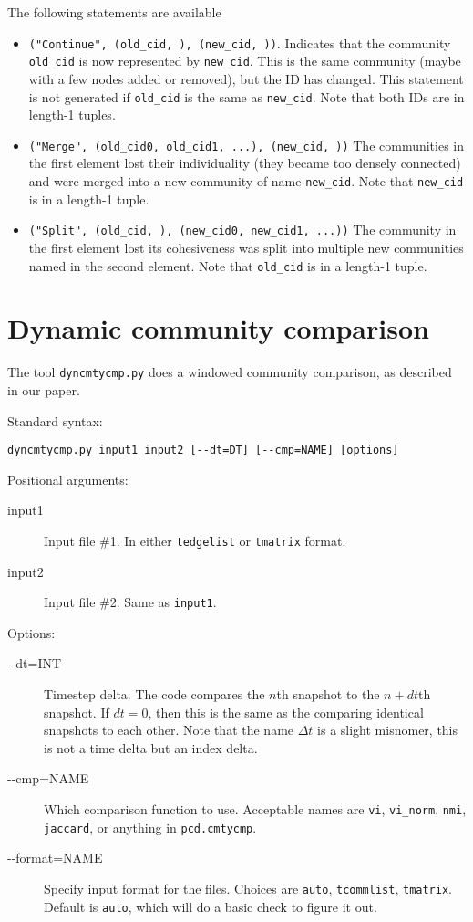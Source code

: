 \documentclass{article}
\begin{document}
The following statements are available
\begin{itemize}
\item \texttt{("Continue", (old\_cid, ), (new\_cid, ))}.  Indicates that the
  community \texttt{old\_cid} is now represented by \texttt{new\_cid}.
  This is the same community (maybe with a few nodes added or
  removed), but the ID has changed.  This statement is not generated
  if \texttt{old\_cid} is the same as \texttt{new\_cid}.  Note that
  both IDs are in length-1 tuples.
\item \texttt{("Merge", (old\_cid0, old\_cid1, ...), (new\_cid, ))} The
  communities in the first element lost their individuality (they
  became too densely connected) and were
  merged into a new community of name \texttt{new\_cid}.  Note that
  \texttt{new\_cid} is in a length-1 tuple.
\item \texttt{("Split", (old\_cid, ), (new\_cid0, new\_cid1, ...))}  The
  community in the first element lost its cohesiveness was split into
  multiple new communities named in the second element.  Note that
  \texttt{old\_cid} is in a length-1 tuple.
\end{itemize}


\section{Dynamic community comparison}

The tool \texttt{dyncmtycmp.py} does a windowed community comparison,
as described in our paper.

Standard syntax:
\begin{verbatim}
dyncmtycmp.py input1 input2 [--dt=DT] [--cmp=NAME] [options]
\end{verbatim}

Positional arguments:
\begin{description}
\item[input1] Input file \#1.  In either \texttt{tedgelist} or
  \texttt{tmatrix} format.
\item[input2] Input file \#2.  Same as \texttt{input1}.
\end{description}

Options:
\begin{description}
\item[-{}-dt=INT] Timestep delta.  The code compares the $n$th snapshot to
  the $n+dt$th snapshot.  If $dt=0$, then this is the same as the
  comparing identical snapshots to each other.  Note that the name
  $\Delta t$ is a slight misnomer, this is not a time delta but an
  index delta.
\item[-{}-cmp=NAME] Which comparison function to use.  Acceptable
  names are \texttt{vi}, \texttt{vi\_norm}, \texttt{nmi},
  \texttt{jaccard}, or anything in \texttt{pcd.cmtycmp}.
\item[-{}-format=NAME] Specify input format for the files.  Choices
  are \texttt{auto}, \texttt{tcommlist}, \texttt{tmatrix}.  Default is
  \texttt{auto}, which will do a basic check to figure it out.
\end{description}
\end{document}
